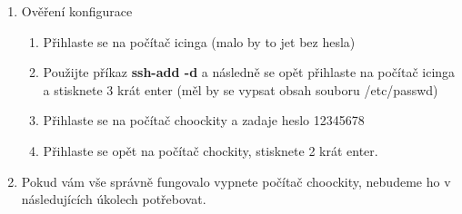 \begin{enumerate}
\begin{enumerate}
      \item Přidejte váš vygenerovaný klíč pomocí příkazu a zadejte heslo:
        \begin{lstlisting}[language=bash]
            [user@pikachu]# ssh-add ~/.ssh/id_rsa
            Enter passphrase for .ssh/id_rsa:
        \end{lstlisting}
      \item Přihlaste se k serveru icinga. Museli jste zadávat znovu heslo?
    \end{enumerate}
  \item Ověření konfigurace
    \begin{enumerate}
        \item Přihlaste se na počítač icinga (malo by to jet bez hesla)
        \item Použijte příkaz \textbf{ssh-add -d} a následně se opět přihlaste na 
        počítač icinga a stisknete 3 krát enter (měl by se vypsat obsah souboru /etc/passwd)
        \item Přihlaste se na počítač choockity a zadaje heslo 12345678
        \item Přihlaste se opět na počítač chockity, stisknete 2 krát enter.
    \end{enumerate}
  \item Pokud vám vše správně fungovalo vypnete počítač choockity, nebudeme ho v následujících úkolech potřebovat.

\end{enumerate}



